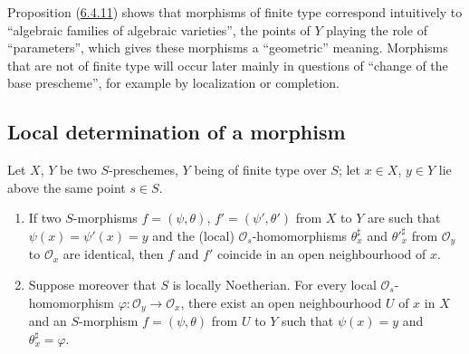 \begin{env}[6.4.13]
\label{I.6.4.13}
Proposition (\hyperref[I.6.4.11]{6.4.11}) shows that morphisms of finite
type correspond intuitively to ``algebraic families of algebraic
varieties'', the points of $Y$ playing
the role of ``parameters'', which gives these morphisms a
``geometric'' meaning. Morphisms that are not of finite type will occur
later mainly in questions of ``change of the base prescheme'', for
example by localization or completion.
\end{env}


\subsection{Local determination of a morphism}
\label{subsection:I.6.5}

\begin{proposition}[6.5.1]
\label{I.6.5.1}
Let $X$, $Y$ be two $S$-preschemes, $Y$ being of finite type over $S$; let
$x\in X$, $y\in Y$ lie above the same point $s\in S$.
\begin{enumerate}
  \item[\textup{(i)}] If two $S$-morphisms $f=(\psi,\theta)$,
    $f'=(\psi',\theta')$ from $X$ to $Y$ are such that
    $\psi(x)=\psi'(x)=y$ and the (local) $\mathscr{O}_s$-homomorphisms
    $\theta_x^\sharp$ and ${\theta'}_x^\sharp$ from $\mathscr{O}_y$ to
    $\mathscr{O}_x$ are identical, then $f$ and $f'$ coincide in an open
    neighbourhood of $x$.
  \item[\textup{(ii)}] Suppose moreover that $S$ is locally Noetherian. For every local
    $\mathscr{O}_s$-homomorphism
    $\varphi:\mathscr{O}_y\to\mathscr{O}_x$, there exist an open neighbourhood
    $U$ of $x$ in $X$ and an $S$-morphism $f=(\psi,\theta)$ from $U$ to $Y$
    such that $\psi(x)=y$ and $\theta_x^\sharp=\varphi$.
\end{enumerate}
\end{proposition}

